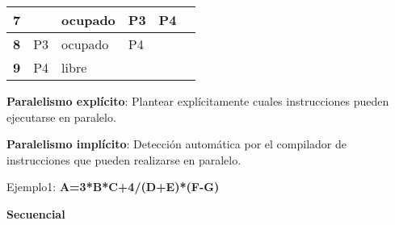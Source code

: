 {\begin{tabular}{|p{59pt}p{59pt}p{59pt}p{59pt}p{59pt}p{59pt}|}
{\textbf{7}
} & \parbox{59pt}{\centering } & \parbox{59pt}{\centering 
ocupado
} & \parbox{59pt}{\centering 
P3
} & \parbox{59pt}{\centering 
P4
} & \parbox{59pt}{
} \\
\hline
\parbox{59pt}{\centering 
\textbf{8}
} & \parbox{59pt}{\centering 
P3
} & \parbox{59pt}{\centering 
ocupado
} & \parbox{59pt}{\centering 
P4
} & \parbox{59pt}{\centering } & \parbox{59pt}{
} \\
\hline
\parbox{59pt}{\centering 
\textbf{9}
} & \parbox{59pt}{\centering 
P4
} & \parbox{59pt}{\centering 
libre
} & \parbox{59pt}{\centering } & \parbox{59pt}{\centering } & \parbox{59pt}{
} \\
\hline
\end{tabular}
\vspace{2pt}

}
\vspace{1cm}

\textbf{Paralelismo explícito}: Plantear explícitamente cuales instrucciones pueden ejecutarse en paralelo.

\textbf{Paralelismo implícito}: Detección automática por el compilador de instrucciones que pueden realizarse en paralelo. \hfill \break

\begin{center}
Ejemplo1: \textbf{A=3*B*C+4/(D+E)*(F-G)}
\end{center}

\begin{center}
\textbf{Secuencial}
\end{center}

